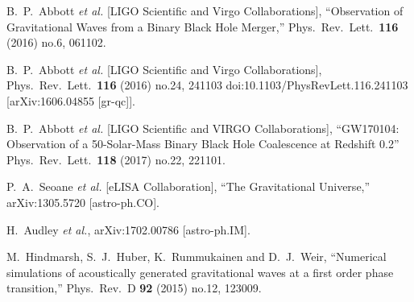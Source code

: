 \documentclass[12pt]{article}
\begin{document}
\begin{thebibliography}{99}

  B.~P.~Abbott {\it et al.} [LIGO Scientific and Virgo Collaborations],
  ``Observation of Gravitational Waves from a Binary Black Hole Merger,''
  Phys.\ Rev.\ Lett.\  {\bf 116} (2016) no.6,  061102.

  B.~P.~Abbott {\it et al.} [LIGO Scientific and Virgo Collaborations],
  Phys.\ Rev.\ Lett.\  {\bf 116} (2016) no.24,  241103
  doi:10.1103/PhysRevLett.116.241103
  [arXiv:1606.04855 [gr-qc]].
  
  B.~P.~Abbott {\it et al.} [LIGO Scientific and VIRGO Collaborations],
  ``GW170104: Observation of a 50-Solar-Mass Binary Black Hole Coalescence at Redshift 0.2''
  Phys.\ Rev.\ Lett.\  {\bf 118} (2017) no.22,  221101.
 
  P.~A.~Seoane {\it et al.} [eLISA Collaboration],
  ``The Gravitational Universe,''
  arXiv:1305.5720 [astro-ph.CO].

  H.~Audley {\it et al.},
  arXiv:1702.00786 [astro-ph.IM].

  
  M.~Hindmarsh, S.~J.~Huber, K.~Rummukainen and D.~J.~Weir,
  ``Numerical simulations of acoustically generated gravitational waves at a first order phase transition,''
  Phys.\ Rev.\ D {\bf 92} (2015) no.12,  123009.
  

\end{thebibliography}
\end{document}
